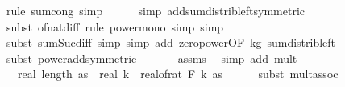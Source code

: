 \begin{isabellebody}
\ {\isacharparenleft}{\kern0pt}rule\ sum{\isachardot}{\kern0pt}cong{\isacharcomma}{\kern0pt}\ simp{\isacharparenright}{\kern0pt}\isanewline
\ \ \ \ \isamarkupfalse%
\ {\isacharparenleft}{\kern0pt}simp\ add{\isacharcolon}{\kern0pt}sum{\isacharunderscore}{\kern0pt}distrib{\isacharunderscore}{\kern0pt}left{\isacharbrackleft}{\kern0pt}symmetric{\isacharbrackright}{\kern0pt}{\isacharparenright}{\kern0pt}\isanewline
\ \ \ \ \isamarkupfalse%
\ {\isacharparenleft}{\kern0pt}subst\ of{\isacharunderscore}{\kern0pt}nat{\isacharunderscore}{\kern0pt}diff{\isacharcomma}{\kern0pt}\ rule\ power{\isacharunderscore}{\kern0pt}mono{\isacharcomma}{\kern0pt}\ simp{\isacharcomma}{\kern0pt}\ simp{\isacharparenright}{\kern0pt}\isanewline
\ \ \ \ \isamarkupfalse%
\ {\isacharparenleft}{\kern0pt}subst\ sum{\isacharunderscore}{\kern0pt}Suc{\isacharunderscore}{\kern0pt}diff{\isacharprime}{\kern0pt}{\isacharcomma}{\kern0pt}\ simp{\isacharcomma}{\kern0pt}\ simp\ add{\isacharcolon}{\kern0pt}\ zero{\isacharunderscore}{\kern0pt}power{\isacharbrackleft}{\kern0pt}OF\ k{\isacharunderscore}{\kern0pt}g{\isacharunderscore}{\kern0pt}{}{\isacharbrackright}{\kern0pt}\ sum{\isacharunderscore}{\kern0pt}distrib{\isacharunderscore}{\kern0pt}left{\isacharparenright}{\kern0pt}\isanewline
\ \ \ \ \isamarkupfalse%
\ {\isacharparenleft}{\kern0pt}subst\ power{\isacharunderscore}{\kern0pt}add{\isacharbrackleft}{\kern0pt}symmetric{\isacharbrackright}{\kern0pt}{\isacharparenright}{\kern0pt}\ \isanewline
\ \ \ \ \isamarkupfalse%
\ assms\ \isamarkupfalse%
\ {\isacharparenleft}{\kern0pt}simp\ add{\isacharcolon}{\kern0pt}\ mult{\isacharunderscore}{\kern0pt}{}{\isacharparenright}{\kern0pt}\isanewline
\ \ \isamarkupfalse%
\ \isamarkupfalse%
\ {\isachardoublequoteopen}{\isachardot}{\kern0pt}{\isachardot}{\kern0pt}{\isachardot}{\kern0pt}\ {\isacharequal}{\kern0pt}\ real\ {\isacharparenleft}{\kern0pt}length\ as{\isacharparenright}{\kern0pt}\ {\isacharasterisk}{\kern0pt}\ real\ k\ {\isacharasterisk}{\kern0pt}\ real{\isacharunderscore}{\kern0pt}of{\isacharunderscore}{\kern0pt}rat\ {\isacharparenleft}{\kern0pt}F\ {\isacharparenleft}{\kern0pt}{}{\isacharasterisk}{\kern0pt}k{\isacharminus}{\kern0pt}{}{\isacharparenright}{\kern0pt}\ as{\isacharparenright}{\kern0pt}{\isachardoublequoteclose}\isanewline
\ \ \ \ \isamarkupfalse%
\ {\isacharparenleft}{\kern0pt}subst\ mult{\isachardot}{\kern0pt}assoc{\isacharparenright}{\kern0pt}\isanewline

\end{isabellebody}
